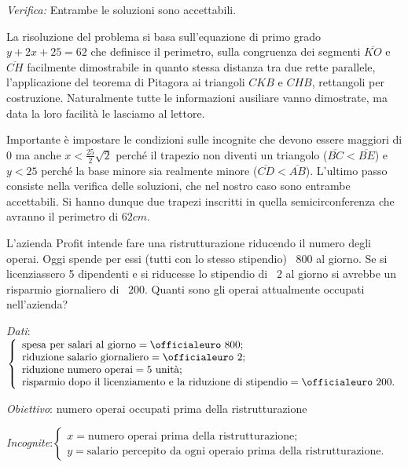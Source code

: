 \emph{Verifica:} Entrambe le soluzioni sono accettabili.

La risoluzione del problema si basa sull'equazione di primo grado $y+2x+25=62$ che definisce il perimetro, sulla congruenza dei segmenti $\overline{KO}$ e $\overline{CH}$ facilmente dimostrabile in quanto stessa distanza tra due rette parallele, l'applicazione del teorema di Pitagora ai triangoli $CKB$ e $CHB$, rettangoli per costruzione. Naturalmente tutte le informazioni ausiliare vanno dimostrate, ma data la loro facilità le lasciamo al lettore.

Importante è impostare le condizioni sulle incognite che devono essere maggiori di $0$ ma anche $x<\frac{25} 2\sqrt 2$ perché il trapezio non diventi un triangolo ($\overline{BC} < \overline{BE}$) e $y<25$ perché la base minore sia realmente minore ($\overline{CD} < \overline{AB}$). L'ultimo passo consiste nella verifica delle soluzioni, che nel nostro caso sono entrambe accettabili. Si hanno dunque due trapezi inscritti in quella semicirconferenza che avranno il perimetro di $62\unit{cm}$.

\begin{problema}
L'azienda Profit intende fare una ristrutturazione riducendo il numero degli operai. Oggi spende per essi (tutti con lo stesso stipendio) \officialeuro~$800$ al giorno. Se si licenziassero 5 dipendenti e si riducesse lo stipendio di \officialeuro~$2$ al giorno si avrebbe un risparmio giornaliero di \officialeuro~$200$. Quanti sono gli operai attualmente occupati nell'azienda?
\end{problema}

\emph{Dati}:$ \left\{\begin{array}{l}
\text{spesa per salari al giorno}=\text{\officialeuro~}800;\\
\text{riduzione salario giornaliero}=\text{\officialeuro~}2;\\
\text{riduzione numero operai}=5\text{ unità};\\
\text{risparmio dopo il licenziamento e la riduzione di stipendio}=\text{\officialeuro~}200.
\end{array}\right.$

\emph{Obiettivo}: numero operai occupati prima della ristrutturazione

\emph{Incognite}:$ \left\{\begin{array}{l}
x =\text{numero operai prima della ristrutturazione};\\
y= \text{salario percepito da ogni operaio prima della ristrutturazione}.
\end{array}\right.$

